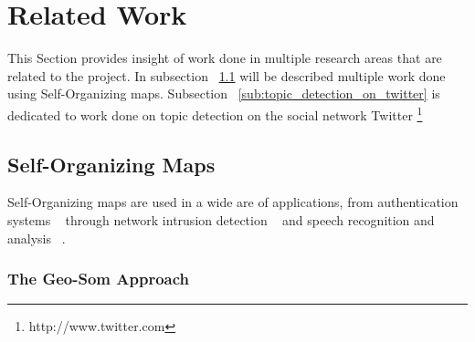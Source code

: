 \section{Related Work} %
\label{sec:related_work}

This Section provides insight of work done in multiple research areas that are related to the project. In subsection ~\ref{sub:self_organizing_maps} will be described multiple work done using Self-Organizing maps. Subsection ~\ref{sub:topic_detection_on_twitter} is dedicated to work done on topic detection on the social network Twitter \footnote{http://www.twitter.com}

\subsection{Self-Organizing Maps} %
\label{sub:self_organizing_maps}
Self-Organizing maps are used in a wide are of applications, from authentication systems ~\cite{Dozono2012} through network intrusion detection ~\cite{intrusion_som} and speech recognition and analysis ~\cite{phonetic_typewiter}.

\subsubsection{The Geo-Som Approach} %
\label{ssub:types_of_soms}



